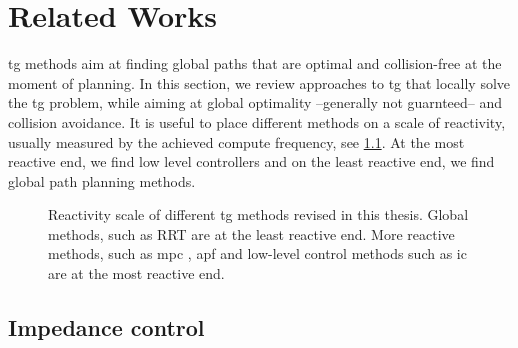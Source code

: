 \chapter{Related Works} %
\label{cha:state}





\newpage


\Acl{tg} methods aim at finding
global paths that are optimal and collision-free at the
moment of planning. In this section, we review approaches to
\ac{tg} that locally solve the \ac{tg} problem, while aiming
at global optimality --generally not guarnteed-- and
collision avoidance. It is useful to place different methods
on a scale of reactivity, usually measured by the achieved
compute frequency, see \cref{fig:reactivity_scale}.
At the most reactive end, we find low
level controllers and on the least reactive end, we find
global path planning methods.
\begin{figure}[h]
  \centering
  
  \caption{Reactivity scale of different \ac{tg} methods
  revised in this thesis. Global methods, such as RRT
  \cite{Karaman2011} are at the least reactive end. More
  reactive methods, such as \ac{mpc}
  \cite{hewing2020learning}, \ac{apf} \cite{Khatib1985} and
  low-level control methods such as \ac{ic} \cite{hogan1985impedance}
  are at the most reactive end.}
  \label{fig:reactivity_scale}
\end{figure}


\section{Impedance control}%
\label{sec:impedance_control}

